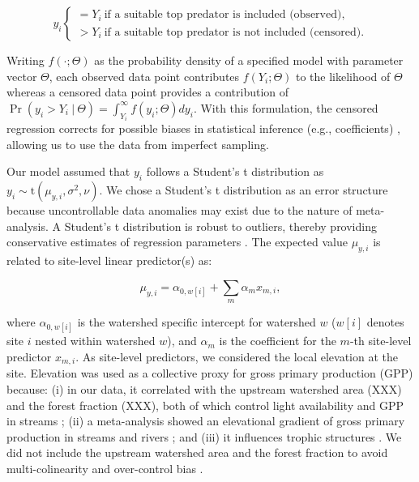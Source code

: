 \documentclass[11pt, class=article, crop=false]{standalone}
\begin{document}
\begin{equation}
    y_i 
    \begin{cases}
        = Y_i~\text{if a suitable top predator is included (observed)},\\
        > Y_i~\text{if a suitable top predator is not included (censored).}
    \end{cases}
\end{equation}

Writing $f(\cdot;\Theta)$ as the probability density of a specified model with parameter vector $\Theta$, each observed data point contributes $f(Y_i;\Theta)$ to the likelihood of $\Theta$ whereas a censored data point provides a contribution of $\Pr(y_i > Y_i~|~\Theta) = \int_{Y_i}^{\infty} f(y_i;\Theta) dy_i$.
With this formulation, the censored regression corrects for possible biases in statistical inference (e.g., coefficients) \citep{terui_stream_2018, lunn_bugs_2012}, allowing us to use the data from imperfect sampling.

Our model assumed that $y_i$ follows a Student's t distribution as $y_i \sim \mbox{t}(\mu_{y,i}, \sigma^2, \nu)$.
We chose a Student's t distribution as an error structure because uncontrollable data anomalies may exist due to the nature of meta-analysis.
A Student's t distribution is robust to outliers, thereby providing conservative estimates of regression parameters \citep{lunn_bugs_2012}.
The expected value $\mu_{y,i}$ is related to site-level linear predictor(s) as:

\begin{equation}
    \mu_{y,i} = \alpha_{0, w[i]} + \sum_m \alpha_m x_{m,i},
\end{equation}

where $\alpha_{0, w[i]}$ is the watershed specific intercept for watershed $w$ ($w[i]$ denotes site $i$ nested within watershed $w$), and $\alpha_m$ is the coefficient for the $m$-th site-level predictor $x_{m, i}$.
As site-level predictors, we considered the local elevation at the site. 
Elevation was used as a collective proxy for gross primary production (GPP) because: (i) in our data, it correlated with the upstream watershed area (XXX) and the forest fraction (XXX), both of which control light availability and GPP in streams \citep{finlay_light-mediated_2011, finlay_stream_2011, bernhardt_light_2022}; (ii) a meta-analysis showed an elevational gradient of gross primary production in streams and rivers \citep{marzolf_ecosystem_2021}; and (iii) it influences trophic structures \citep{oksanen_exploitation_1981}.
We did not include the upstream watershed area and the forest fraction to avoid multi-colinearity and over-control bias \citep{arif_predictive_2022}.
\end{document}
